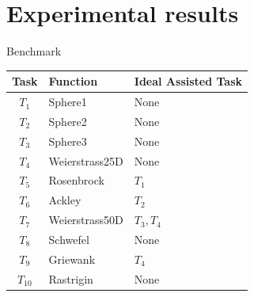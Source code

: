 \section{Experimental results}

\begin{frame}{Benchmark}
    \begin{table}[]
        \begin{tabular}{|c|l|l|}
            \hline
            \textbf{Task} & \textbf{Function} & \textbf{Ideal Assisted Task} \\ \hline \hline
            $T_1$        & Sphere1            & None  \\ \hline
            $T_2$        & Sphere2            & None  \\ \hline
            $T_3$        & Sphere3            & None  \\ \hline
            $T_4$        & Weierstrass25D     & None  \\ \hline
            $T_5$        & Rosenbrock         & $T_1$  \\ \hline
            $T_6$        & Ackley             & $T_2$  \\ \hline
            $T_7$        & Weierstrass50D     & $T_3, T_4$  \\ \hline
            $T_8$        & Schwefel           & None  \\ \hline
            $T_9$        & Griewank           & $T_4$  \\ \hline
            $T_10$       & Rastrigin          & None  \\ \hline
        \end{tabular}
    \end{table}
\end{frame}

